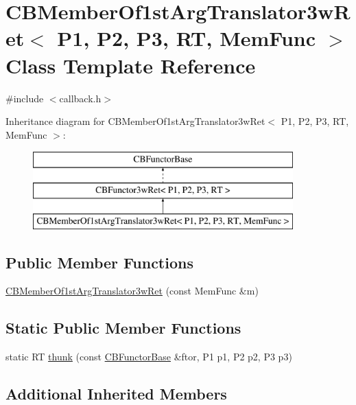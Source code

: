 \hypertarget{class_c_b_member_of1st_arg_translator3w_ret}{\section{C\+B\+Member\+Of1st\+Arg\+Translator3w\+Ret$<$ P1, P2, P3, R\+T, Mem\+Func $>$ Class Template Reference}
\label{class_c_b_member_of1st_arg_translator3w_ret}
}


{\ttfamily \#include $<$callback.\+h$>$}

Inheritance diagram for C\+B\+Member\+Of1st\+Arg\+Translator3w\+Ret$<$ P1, P2, P3, R\+T, Mem\+Func $>$\+:\begin{figure}[H]
\begin{center}
\leavevmode
\includegraphics[height=3.000000cm]{class_c_b_member_of1st_arg_translator3w_ret}
\end{center}
\end{figure}
\subsection*{Public Member Functions}
\begin{DoxyCompactItemize}
\item 
\hyperlink{class_c_b_member_of1st_arg_translator3w_ret_a1cc9c0e22254d70012d775811e803851}{C\+B\+Member\+Of1st\+Arg\+Translator3w\+Ret} (const Mem\+Func \&m)
\end{DoxyCompactItemize}
\subsection*{Static Public Member Functions}
\begin{DoxyCompactItemize}
\item 
static R\+T \hyperlink{class_c_b_member_of1st_arg_translator3w_ret_a76d2c43bcccf4bba447159433ad02a40}{thunk} (const \hyperlink{class_c_b_functor_base}{C\+B\+Functor\+Base} \&ftor, P1 p1, P2 p2, P3 p3)
\end{DoxyCompactItemize}
\subsection*{Additional Inherited Members}



